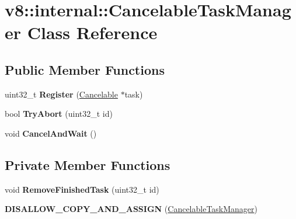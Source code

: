 \hypertarget{classv8_1_1internal_1_1_cancelable_task_manager}{}\section{v8\+:\+:internal\+:\+:Cancelable\+Task\+Manager Class Reference}
\label{classv8_1_1internal_1_1_cancelable_task_manager}
\subsection*{Public Member Functions}
\begin{DoxyCompactItemize}
\item 
uint32\+\_\+t {\bfseries Register} (\hyperlink{classv8_1_1internal_1_1_cancelable}{Cancelable} $\ast$task)\hypertarget{classv8_1_1internal_1_1_cancelable_task_manager_a8312c9f10e28c3f00d7ec02d1007b97d}{}\label{classv8_1_1internal_1_1_cancelable_task_manager_a8312c9f10e28c3f00d7ec02d1007b97d}

\item 
bool {\bfseries Try\+Abort} (uint32\+\_\+t id)\hypertarget{classv8_1_1internal_1_1_cancelable_task_manager_a6cfcf958b2ce21c8fb82ffdd10e52364}{}\label{classv8_1_1internal_1_1_cancelable_task_manager_a6cfcf958b2ce21c8fb82ffdd10e52364}

\item 
void {\bfseries Cancel\+And\+Wait} ()\hypertarget{classv8_1_1internal_1_1_cancelable_task_manager_a3c90c3d841ccd5255387b37fcfbc03c0}{}\label{classv8_1_1internal_1_1_cancelable_task_manager_a3c90c3d841ccd5255387b37fcfbc03c0}

\end{DoxyCompactItemize}
\subsection*{Private Member Functions}
\begin{DoxyCompactItemize}
\item 
void {\bfseries Remove\+Finished\+Task} (uint32\+\_\+t id)\hypertarget{classv8_1_1internal_1_1_cancelable_task_manager_a3b87f5c8f4d2a6c623ff523845dca3ee}{}\label{classv8_1_1internal_1_1_cancelable_task_manager_a3b87f5c8f4d2a6c623ff523845dca3ee}

\item 
{\bfseries D\+I\+S\+A\+L\+L\+O\+W\+\_\+\+C\+O\+P\+Y\+\_\+\+A\+N\+D\+\_\+\+A\+S\+S\+I\+GN} (\hyperlink{classv8_1_1internal_1_1_cancelable_task_manager}{Cancelable\+Task\+Manager})\hypertarget{classv8_1_1internal_1_1_cancelable_task_manager_a5511f7ac67814c4444f9bb4fabbb699d}{}\label{classv8_1_1internal_1_1_cancelable_task_manager_a5511f7ac67814c4444f9bb4fabbb699d}

\end{DoxyCompactItemize}
